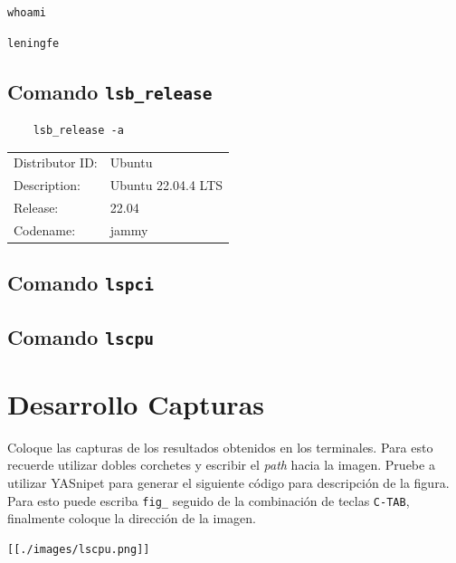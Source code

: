 \documentclass{article}
\begin{document}
\begin{verbatim}
whoami
\end{verbatim}

\begin{verbatim}
leningfe
\end{verbatim}

\subsection{Comando \texttt{lsb\_release}}
\label{sec:org00addb9}
\begin{verbatim}
    lsb_release -a
\end{verbatim}

\begin{center}
\begin{tabular}{ll}
Distributor ID: & Ubuntu\\[0pt]
Description: & Ubuntu 22.04.4 LTS\\[0pt]
Release: & 22.04\\[0pt]
Codename: & jammy\\[0pt]
\end{tabular}
\end{center}


\subsection{Comando \texttt{lspci}}
\label{sec:orge78c751}



\subsection{Comando \texttt{lscpu}}
\label{sec:orgb4cee41}

\section{Desarrollo Capturas}
\label{sec:org51f62b1}
Coloque las capturas de los resultados obtenidos en los
terminales. Para esto recuerde utilizar dobles corchetes y escribir el
\emph{path} hacia la imagen. Pruebe a utilizar YASnipet para generar el
siguiente código para descripción de la figura. Para esto puede
escriba \texttt{fig\_} seguido de la combinación de teclas \texttt{C-TAB}, finalmente
coloque la dirección de la imagen.

\begin{verbatim}
[[./images/lscpu.png]]
\end{verbatim}
\end{document}
